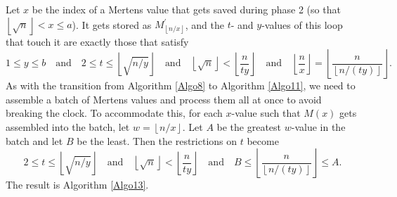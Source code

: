 \documentclass[12pt]{article}
\newcommand{\eqn}[1]{\begin{displaymath} #1 \end{displaymath}}
\newcommand{\neqn}[1]{\begin{equation} #1 \end{equation}}
\newcommand{\floor}[1]{{\left\lfloor #1 \right\rfloor}}
\newcommand{\quadtext}[1]{\quad \text{#1} \quad}
\newcommand{\floordiv}[2]{\floor{\frac{#1}{#2}}}
\newcommand{\isqrt}[1]{\floor{\sqrt{#1}}}
\begin{document}
Let $x$ be the index of a Mertens value that gets saved during phase 2 (so that $\isqrt{n} < x \leq a$).  It gets stored as $M^\prime_\floor{n/x}$, and the $t$- and $y$-values of this loop that touch it are exactly those that satisfy
\eqn{1 \leq y \leq b \quadtext{and} 2 \leq t \leq \isqrt{n/y} \quadtext{and} \isqrt{n} < \floordiv{n}{ty} \quadtext{and} \floordiv{n}{x} = \floordiv{n}{\floor{n/(ty)}}.}
As with the transition from Algorithm \ref{Algo8} to Algorithm \ref{Algo11}, we need to assemble a batch of Mertens values and process them all at once to avoid breaking the clock.  To accommodate this, for each $x$-value such that $M(x)$ gets assembled into the batch, let $w=\floor{n/x}$.  Let $A$ be the greatest $w$-value in the batch and let $B$ be the least.  Then the restrictions on $t$ become
\neqn{2 \leq t \leq \isqrt{n/y} \quadtext{and} \isqrt{n} < \floordiv{n}{ty} \quadtext{and} B \leq \floordiv{n}{\floor{n/(ty)}} \leq A. \label{cbafnlj}}
The result is Algorithm \ref{Algo13}.
\end{document}

